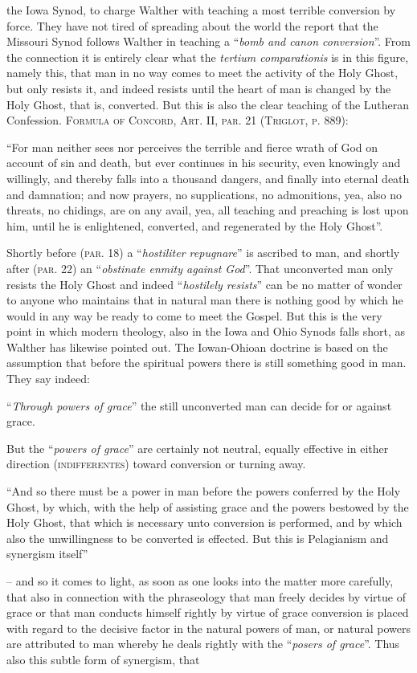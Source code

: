 the Iowa Synod, to charge Walther with teaching a most terrible conversion by force.  They have not tired of spreading about the world the report that the Missouri Synod follows Walther in teaching a “\textit{bomb and canon conversion}”.  From the connection it is entirely clear what the \textit{tertium comparationis} is in this figure, namely this, that man in no way comes to meet the activity of the Holy Ghost, but only resists it, and indeed resists until the heart of man is changed by the Holy Ghost, that is, converted.  But this is also the clear teaching of the Lutheran Confession. {\scriptsize\textsc{Formula of Concord, Art. II, par. 21 (Triglot, p. 889)}}: \begin{displayquote}“For man neither sees nor perceives the terrible and fierce wrath of God on account of sin and death, but ever continues in his security, even knowingly and willingly, and thereby falls into a thousand dangers, and finally into eternal death and damnation; and now prayers, no supplications, no admonitions, yea, also no threats, no chidings, are on any avail, yea, all teaching and preaching is lost upon him, until he is enlightened, converted, and regenerated by the Holy Ghost”.\end{displayquote}  Shortly before {\scriptsize\textsc{(par. 18)}} a “\textit{hostiliter repugnare}” is ascribed to man, and shortly after {\scriptsize\textsc{(par. 22)}} an “\textit{obstinate enmity against God}”.  That unconverted man only resists the Holy Ghost and indeed “\textit{hostilely resists}” can be no matter of wonder to anyone who maintains that in natural man there is nothing good by which he would in any way be ready to come to meet the Gospel.  But this is the very point in which modern theology, also in the Iowa and Ohio Synods falls short, as Walther has likewise pointed out.  The Iowan-Ohioan doctrine is based on the assumption that before the spiritual powers there is still something good in man.  They say indeed: \begin{displayquote}“\textit{Through powers of grace}” the still unconverted man can decide for or against grace.\end{displayquote}  But the “\textit{powers of grace}” are certainly not neutral, equally effective in either direction {\scriptsize\textsc{(indifferentes)}} toward conversion or turning away.  \begin{displayquote}“And so there must be a power in man before the powers conferred by the Holy Ghost, by which, with the help of assisting grace and the powers bestowed by the Holy Ghost, that which is necessary unto conversion is performed, and by which also the unwillingness to be converted is effected.  But this is Pelagianism and synergism itself''\end{displayquote} -- and so it comes to light, as soon as one looks into the matter more carefully, that also in connection with the phraseology that man freely decides by virtue of grace or that man conducts himself rightly by virtue of grace conversion is placed with regard to the decisive factor in the natural powers of man, or natural powers are attributed to man whereby he deals rightly with the “\textit{posers of grace}”.  Thus also this subtle form of synergism, that 